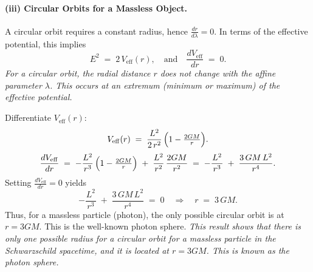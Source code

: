\documentclass{article}
\begin{document}
\paragraph{(iii) Circular Orbits for a Massless Object.}
A circular orbit requires a constant radius, hence
\(\tfrac{dr}{d\lambda} = 0\). In terms of the effective potential, this implies
\begin{equation*}
E^2 \;=\; 2\,V_\mathrm{eff}(r),
\quad\text{and}\quad
\frac{dV_\mathrm{eff}}{dr}\;=\;0.
\end{equation*}
\textit{For a circular orbit, the radial distance $r$ does not change with the affine parameter $\lambda$. This occurs at an extremum (minimum or maximum) of the effective potential.}

Differentiate \(V_\mathrm{eff}(r)\):
\begin{equation*}
V_\mathrm{eff}(r)
\;=\;
\frac{L^2}{2\,r^2}\,\Bigl(1 - \tfrac{2GM}{r}\Bigr).
\end{equation*}
\begin{equation*}
\frac{dV_\mathrm{eff}}{dr}
\;=\;
-\frac{L^2}{r^3}\,\Bigl(1 - \tfrac{2GM}{r}\Bigr)
\;+\;
\frac{L^2}{r^2}\,\frac{2GM}{r^2}
\;=\;
-\frac{L^2}{\,r^3\,}
\;+\;
\frac{3\,GM\,L^2}{\,r^4\,}.
\end{equation*}
Setting \(\tfrac{dV_\mathrm{eff}}{dr} = 0\) yields
\begin{equation*}
-\frac{L^2}{\,r^3\,}
\;+\;
\frac{3\,GM\,L^2}{\,r^4\,}
\;=\; 0
\quad\Longrightarrow\quad
r \;=\; 3\,GM.
\end{equation*}
Thus, for a massless particle (photon), the only possible circular orbit is at \(r = 3GM\). This is the well-known photon sphere.
\textit{This result shows that there is only one possible radius for a circular orbit for a massless particle in the Schwarzschild spacetime, and it is located at $r = 3GM$. This is known as the photon sphere.}
\end{document}

